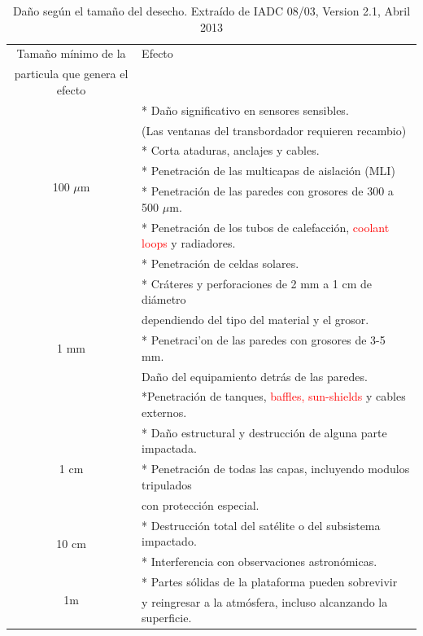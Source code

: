  \begin{table}[h]
\centering
\begin{tabular}[c]{|c l|}
\hline
\hline
Tama\~no m\'inimo de la  &    Efecto\\
particula que genera el efecto & \\
\hline
\hline
\multirow{ 7}{*}{100 $\mu$m }& * Da\~no significativo en sensores sensibles.\\
& (Las ventanas del transbordador requieren recambio)\\
& * Corta ataduras, anclajes y cables.\\
& * Penetraci\'on de las multicapas de aislaci\'on (MLI)\\
& * Penetraci\'on de las paredes con grosores de 300 a 500 $\mu$m.\\
& * Penetraci\'on de los tubos de calefacci\'on, \textcolor{red}{coolant loops} y radiadores.\\
& * Penetraci\'on de celdas solares.\\
\hline 
\multirow{ 5}{*}{1 mm }& * Cr\'ateres y perforaciones de 2 mm a 1 cm de di\'ametro\\
& dependiendo del tipo del material y el grosor.\\
& * Penetraci'on de las paredes con grosores de 3-5 mm.\\
& Da\~no del equipamiento detr\'as de las paredes.\\
& *Penetraci\'on de tanques, \textcolor{red}{baffles, sun-shields} y cables externos.\\
\hline
\multirow{ 3}{*}{1 cm } & * Da\~no estructural y destrucci\'on de alguna parte impactada.\\
& * Penetraci\'on de todas las capas, incluyendo modulos tripulados\\
& con protecci\'on especial.\\
\hline
\multirow{ 2}{*}{10 cm} & * Destrucci\'on total del sat\'elite o del subsistema impactado.\\
& * Interferencia con observaciones astron\'omicas.\\
\hline
\multirow{ 2}{*}{1m}& * Partes s\'olidas de la plataforma pueden sobrevivir\\
& y reingresar a la atmósfera, incluso alcanzando la superficie.\\
\hline
\end{tabular}
\label{tab:tamanioDanio}
\caption[Da\~no seg\'un el tama\~no del desecho.]{Da\~no seg\'un el tama\~no del desecho. Extra\'ido de IADC 08/03, Version 2.1, Abril 2013}
\end{table}

